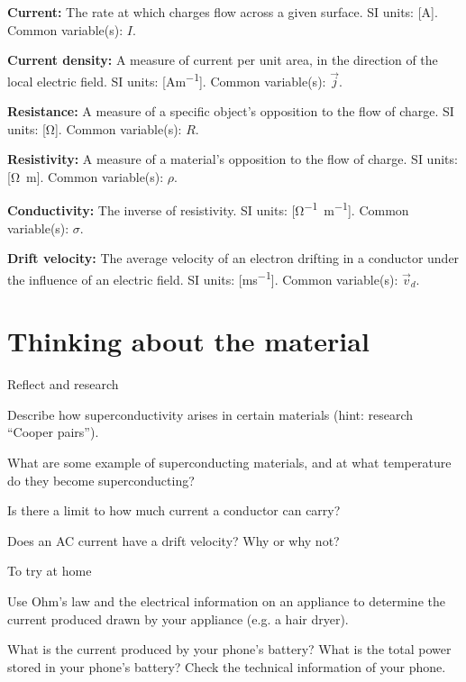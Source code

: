 \vspace{-0.25cm}
\begin{definitions}
	\item \textbf{Current:} The rate at which charges flow across a given surface. SI units: [\si{A}]. Common variable(s): $I$.
	\item \textbf{Current density:} A measure of current per unit area, in the direction of the local electric field. SI units: [\si{Am^{-1}}]. Common variable(s): $\vec j$.
	\item \textbf{Resistance:} A measure of a specific object's opposition to the flow of charge. SI units: [\si{\ohm}]. Common variable(s): $R$.
	\item \textbf{Resistivity:} A measure of a material's opposition to the flow of charge. SI units: [\si{\ohm m}]. Common variable(s): $\rho$.
	\item \textbf{Conductivity:} The inverse of resistivity. SI units: [\si{\ohm^{-1} m^{-1}}]. Common variable(s): $\sigma$.
	\item \textbf{Drift velocity:} The average velocity of an electron drifting in a conductor under the influence of an electric field. SI units: [\si{ms^{-1}}]. Common variable(s): $\vec v_{d}$.
\end{definitions}

\newpage
\section{Thinking about the material}

\begin{chapteractivity}{Reflect and research}
{
\item Describe how superconductivity arises in certain materials (hint: research ``Cooper pairs'').
\item What are some example of superconducting materials, and at what temperature do they become superconducting?
\item Is there a limit to how much current a conductor can carry?
\item Does an AC current have a drift velocity? Why or why not?
}
\end{chapteractivity}

\begin{chapteractivity}{To try at home}
{

\item Use Ohm's law and the electrical information on an appliance to determine the current produced drawn by your appliance (e.g. a hair dryer).
\item What is the current produced by your phone's battery? What is the total power stored in your phone's battery? Check the technical information of your phone.
}
\end{chapteractivity}

